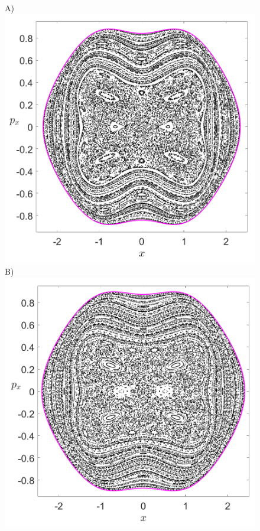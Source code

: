 \documentclass[10pt,aps,onecolumn,superscriptaddress]{revtex4-2}
\begin{document}
\begin{figure}[htbp]
	A)\includegraphics[scale=0.3]{PS_y_0_H_-0_2_w0_1div2_k_sqrt7_min_5delta_d_1.png}
	B)\includegraphics[scale=0.3]{PS_y_0_H_-0_2_w0_1div2_k_sqrt7_min_4delta_d_1.png}	

\end{figure}
\end{document}

